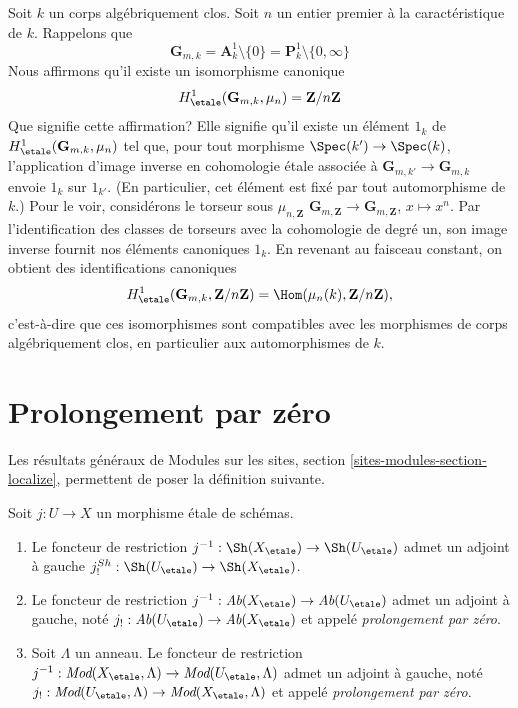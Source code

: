 \begin{remark}
\label{remark-normalize-H1-Gm}
Soit $k$ un corps algébriquement clos. Soit $n$ un entier premier à
la caractéristique de $k$. Rappelons que
$$
\mathbf{G}_{m, k} = \mathbf{A}^1_k \setminus \{0\} =
\mathbf{P}^1_k \setminus \{0, \infty\}
$$
Nous affirmons qu'il existe un isomorphisme canonique
$$
H^1_\etale(\mathbf{G}_{m, k}, \mu_n) = \mathbf{Z}/n\mathbf{Z}
$$
Que signifie cette affirmation? Elle signifie qu'il existe un élément $1_k$ de
$H^1_\etale(\mathbf{G}_{m, k}, \mu_n)$ tel que, pour
tout morphisme $\Spec(k') \to \Spec(k)$, l'application d'image inverse en
cohomologie étale associée à $\mathbf{G}_{m, k'} \to \mathbf{G}_{m, k}$
envoie $1_k$ sur $1_{k'}$. (En particulier, cet élément est
fixé par tout automorphisme de $k$.) Pour le voir, considérons le
torseur sous $\mu_{n, \mathbf{Z}}$
$\mathbf{G}_{m, \mathbf{Z}} \to \mathbf{G}_{m, \mathbf{Z}}$,
$x \mapsto x^n$. Par l'identification des classes de torseurs avec la
cohomologie de degré un, son image inverse fournit nos éléments canoniques $1_k$.
En revenant au faisceau constant, on obtient des identifications canoniques
$$
H^1_\etale(\mathbf{G}_{m, k}, \mathbf{Z}/n\mathbf{Z}) =
\Hom(\mu_n(k), \mathbf{Z}/n\mathbf{Z}),
$$
c'est-à-dire que ces isomorphismes sont compatibles avec les morphismes de
corps algébriquement clos, en particulier aux
automorphismes de $k$.
\end{remark}










\section{Prolongement par zéro}
\label{section-extension-by-zero}

\noindent
Les résultats généraux de
Modules sur les sites, section \ref{sites-modules-section-localize},
permettent de poser la définition suivante.

\begin{definition}
\label{definition-extension-zero}
Soit $j : U \to X$ un morphisme étale de schémas.
\begin{enumerate}
\item Le foncteur de restriction
$j^{-1} : \Sh(X_\etale) \to \Sh(U_\etale)$
admet un adjoint à gauche
$j_!^{Sh} : \Sh(U_\etale) \to \Sh(X_\etale)$.
\item Le foncteur de restriction
$j^{-1} : \textit{Ab}(X_\etale) \to \textit{Ab}(U_\etale)$
admet un adjoint à gauche, noté
$j_! : \textit{Ab}(U_\etale) \to \textit{Ab}(X_\etale)$
et appelé {\it prolongement par zéro}.
\item Soit $\Lambda$ un anneau. Le foncteur de restriction
$j^{-1} : \textit{Mod}(X_\etale, \Lambda) \to
\textit{Mod}(U_\etale, \Lambda)$
admet un adjoint à gauche, noté
$j_! : \textit{Mod}(U_\etale, \Lambda) \to
\textit{Mod}(X_\etale, \Lambda)$
et appelé {\it prolongement par zéro}.
\end{enumerate}
\end{definition}

